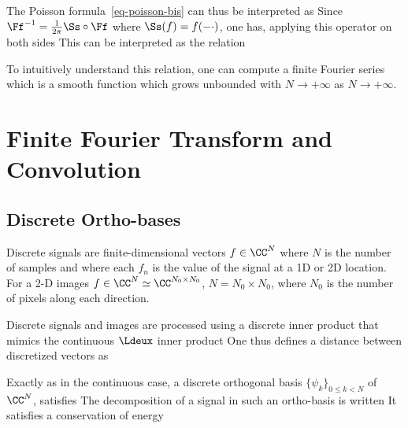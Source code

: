 The Poisson formula~\eqref{eq-poisson-bis} can thus be interpreted as
Since $\Ff^{-1} = \frac{1}{2\pi} \Ss \circ \Ff$ where $\Ss(f)=f(-\cdot)$, one has, applying this operator on both sides
This can be interpreted as the relation

To intuitively understand this relation, one can compute a finite Fourier series
which is a smooth function which grows unbounded with $N \rightarrow +\infty$ as $N \rightarrow +\infty$. 

\section{Finite Fourier Transform and Convolution}
\label{sec-dft}

\subsection{Discrete Ortho-bases}

Discrete signals are finite-dimensional vectors $f \in \CC^N$ where $N$ is the number of samples and where each $f_n$ is the value of the signal at a 1D or 2D location. For a 2-D images $f \in \CC^N \simeq \CC^{N_0 \times N_0}$, $N = N_0 \times N_0$, where $N_0$ is the number of pixels along each direction.

Discrete signals and images are processed using a discrete inner product that mimics the continuous $\Ldeux$ inner product
One thus defines a distance between discretized vectors as

Exactly as in the continuous case, a discrete orthogonal basis $\{ \psi_k \}_{0 \leq k < N }$ of $\CC^N$, satisfies
The decomposition of a signal in such an ortho-basis is written
It satisfies a conservation of energy


